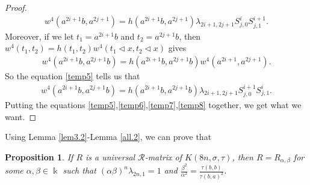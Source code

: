 \documentclass[a4paper,11pt]{amsart}
\numberwithin{equation}{section}
\newtheorem{proposition}[theorem]{Proposition}
\begin{document}
\begin{proof}
\begin{align}
\label{temp7} w^4(a^{2i+1}b,a^{2j+1})=h(a^{2i+1}b,a^{2j+1}) \lambda_{2i+1,2j+1} S_{j,0}^{i} S_{j,1}^{i+1}.
\end{align}
 Moreover, if we let $t_1=a^{2i+1}b$ and $t_2=a^{2j+1}b$, then $w^4(t_1,t_2)=h(t_1,t_2)w^4(t_1\triangleleft x, t_2\triangleleft x)$ gives
\begin{align*}
w^4(a^{2i+1}b,a^{2j+1}b)=h(a^{2i+1}b,a^{2j+1}b)w^4(a^{2i+1},a^{2j+1}).
\end{align*}
So the equation \eqref{temp5} tells us that
\begin{align}
\label{temp8} w^4(a^{2i+1}b,a^{2j+1}b)=h(a^{2i+1}b,a^{2j+1}b) \lambda_{2i+1,2j+1} S_{j,0}^{i+1} S_{j,1}^{i}.
\end{align}
 Putting the equations \eqref{temp5},\eqref{temp6},\eqref{temp7},\eqref{temp8} together, we get what we want.
\end{proof}
Using Lemma \ref{lem3.2}-Lemma \ref{all.2}, we can prove that
\begin{proposition} \label{addpro}
If $R$ is a universal $\mathcal{R}$-matrix of $K(8n,\sigma,\tau)$, then $R=R_{\alpha,\beta}$ for some $\alpha,\beta \in \Bbbk$ such that $(\alpha\beta)^n\lambda_{2n,1}=1$ and $\frac{\beta^2}{\alpha^2}=\frac{\tau(b,b)}{\tau(b,a)^2}$.
\end{proposition}
\end{document}
